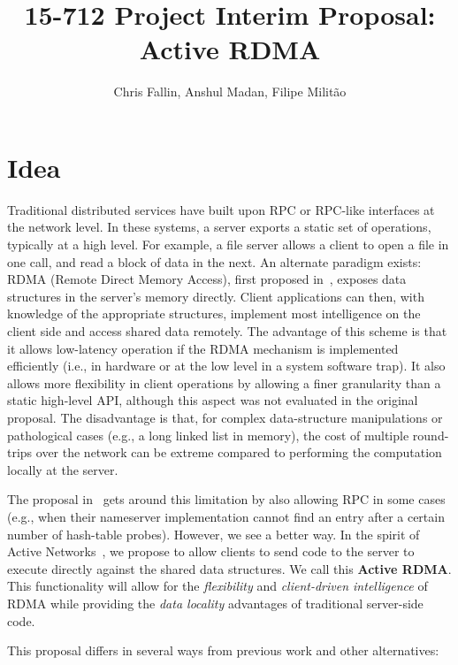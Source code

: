 \documentclass[10pt]{article}
\title{15-712 Project Interim Proposal: Active RDMA}
\author{Chris Fallin, Anshul Madan, Filipe Milit\~{a}o}
\date{}
\begin{document}
\maketitle

\section{Idea}

Traditional distributed services have built upon RPC or RPC-like
interfaces at the network level. In these systems, a server exports a
static set of operations, typically at a high level. For example, a
file server allows a client to open a file in one call, and read a
block of data in the next. An alternate paradigm exists: RDMA (Remote
Direct Memory Access), first proposed in~\cite{thekkath94}, exposes
data structures in the server's memory directly. Client applications
can then, with knowledge of the appropriate structures, implement most
intelligence on the client side and access shared data remotely. The
advantage of this scheme is that it allows low-latency operation if
the RDMA mechanism is implemented efficiently (i.e., in hardware or at
the low level in a system software trap). It also allows more
flexibility in client operations by allowing a finer granularity than
a static high-level API, although this aspect was not evaluated in the
original proposal. The disadvantage is that, for complex
data-structure manipulations or pathological cases (e.g., a long
linked list in memory), the cost of multiple round-trips over the
network can be extreme compared to performing the computation locally
at the server.

The proposal in~\cite{thekkath94} gets around this limitation by also
allowing RPC in some cases (e.g., when their nameserver implementation
cannot find an entry after a certain number of hash-table
probes). However, we see a better way. In the spirit of Active
Networks~\cite{AN-survey}, we propose to allow clients to send code to
the server to execute directly against the shared data structures. We
call this \textbf{Active RDMA}. This functionality will allow for the
\emph{flexibility} and \emph{client-driven intelligence} of RDMA while
providing the \emph{data locality} advantages of traditional
server-side code.

This proposal differs in several ways from previous work and other
alternatives:
\end{document}
